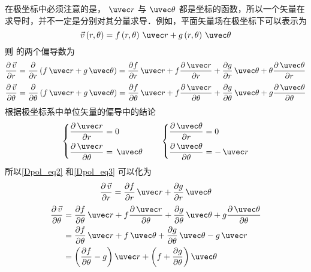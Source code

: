 
在极坐标中必须注意的是， $\uvec r$ 与 $\uvec \theta $ 都是坐标的函数，所以一个矢量在求导时，并不一定是分别对其分量求导．例如，平面矢量场在极坐标下可以表示为
\begin{equation}\label{Dpol_eq1}
\vec v\left( {r,\theta } \right) = f\left( {r,\theta } \right)\,\uvec r + g\left( {r,\theta } \right)\,\uvec \theta 
\end{equation}
则 的两个偏导数为
\begin{equation}\label{Dpol_eq2}
\frac{{\partial \,\vec v}}{{\partial r}} = \frac{\partial }{{\partial r}}\left( {f\,\uvec r + g\,\uvec \theta } \right) = \frac{{\partial f}}{{\partial r}}\,\uvec r + f\frac{{\partial \,\uvec r}}{{\partial r}} + \frac{{\partial g}}{{\partial r}}\,\uvec \theta  + \theta \frac{{\partial \,\uvec \theta }}{{\partial r}}
\end{equation}
\begin{equation}\label{Dpol_eq3}
\frac{{\partial \,\vec v}}{{\partial \theta }} = \frac{\partial }{{\partial \theta }}\left( {f\,\uvec r + g\,\uvec \theta } \right) = \frac{{\partial f}}{{\partial \theta }}\,\uvec r + f\frac{{\partial \,\uvec r}}{{\partial \theta }} + \frac{{\partial g}}{{\partial \theta }}\,\uvec \theta  + g\frac{{\partial \,\uvec \theta }}{{\partial \theta }}
\end{equation}
根据极坐标系中单位矢量的偏导中的结论
\begin{equation}
\left\{ \begin{aligned}
\frac{{\partial \,\uvec r}}{{\partial r}} &= 0\\
\frac{{\partial \,\uvec r}}{{\partial \theta }} &= \,\uvec \theta 
\end{aligned} \right.
\qquad
\left\{ \begin{aligned}
\frac{{\partial \,\uvec \theta }}{{\partial r}} &= 0\\
\frac{{\partial \,\uvec \theta }}{{\partial \theta }} &=  - \,\uvec r
\end{aligned} \right.
\end{equation}
所以\autoref{Dpol_eq2} 和\autoref{Dpol_eq3} 可以化为
\begin{equation}
\frac{{\partial \,\vec v}}{{\partial r}} = \frac{{\partial f}}{{\partial r}}\,\uvec r + \frac{{\partial g}}{{\partial r}}\,\uvec \theta 
\end{equation}
\begin{equation}\begin{aligned}
\frac{{\partial \,\vec v}}{{\partial \theta }} &= \frac{{\partial f}}{{\partial \theta }}\,\uvec r + f\frac{{\partial \,\uvec r}}{{\partial \theta }} + \frac{{\partial g}}{{\partial \theta }}\,\uvec \theta  + g\frac{{\partial \,\uvec \theta }}{{\partial \theta }}\\
 &= \frac{{\partial f}}{{\partial \theta }}\,\uvec r + f\,\uvec \theta + \frac{{\partial g}}{{\partial \theta }}\,\uvec \theta  - g\,\uvec r\\
 &= \left( {\frac{{\partial f}}{{\partial \theta }} - g} \right)\uvec r + \left( {f + \frac{{\partial g}}{{\partial \theta }}} \right)\uvec \theta 
\end{aligned}\end{equation}
 
